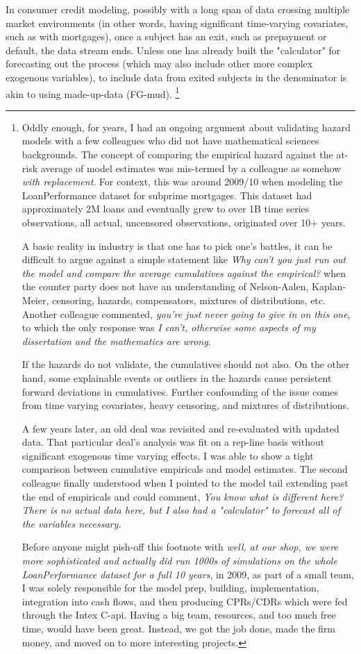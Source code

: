 \documentclass[10pt]{article}
\begin{document}
In consumer credit modeling, possibly with a long span of data crossing multiple market environments
(in other words, having significant time-varying covariates, such as with mortgages), 
once a subject has an exit, such as prepayment or default, the data stream ends.  
Unless one has already built the "calculator" for forecasting out the process (which may also include other 
more complex exogenous variables), to include
data from exited subjects in the denominator is akin to using made-up-data (FG-mud).
\footnote{Oddly enough, for years, I had an ongoing argument about validating hazard models with a few colleagues who did not have
mathematical sciences backgrounds.
The concept of comparing the empirical hazard against the at-risk average of model estimates was mis-termed by a colleague as somehow {\em with
replacement}.  For context, this was around 2009/10 when modeling the LoanPerformance dataset for subprime mortgages.  This dataset had
approximately 2M loans and eventually grew to over 1B time series observations, all actual, uncensored observations, originated over 10+
years.

A basic reality in industry is that one has to pick one's battles, 
it can be difficult to argue against a simple statement like
{\em Why can't you just run out the model and compare the average cumulatives
against the empirical?} when the counter party does not have an understanding of Nelson-Aalen, Kaplan-Meier, censoring, hazards, compensators, mixtures of
distributions, etc.  
Another colleague commented, {\em you're just never going to give in on this one}, to which the only response was {\em I can't, otherwise some aspects of my dissertation and 
the mathematics are wrong}.  

If the hazards do not validate, the cumulatives should not also.  On the other hand, 
some explainable events or outliers in the hazards cause persistent forward deviations in cumulatives.
Further confounding of the issue comes from time varying covariates, heavy censoring, and mixtures of distributions.

A few years later, an old deal was revisited and re-evaluated with updated data.  
That particular deal's analysis was fit on a rep-line basis without significant exogenous time varying effects.  
I was able to show a tight comparison between cumulative empiricals and model estimates.
The second colleague finally understood 
when I pointed to the model tail extending past the end of empiricals and could comment, {\em You know what is different here? There is no
actual data here, but I also had a "calculator" to forecast all of the variables necessary.}

Before anyone might pish-off this footnote with {\em well, at our shop, we were more sophisticated and actually did run 1000s of simulations on the
whole LoanPerformance dataset for a full 10 years}, in 2009, as part of a small team, I was solely responsible for the model prep, building, implementation, 
integration into cash flows, and then producing CPRs/CDRs which were fed through the Intex C-api.  Having a big team, resources, and too
much free time, would have been great. Instead, we got the job done, made the firm money, and moved on to more interesting projects.
}
\end{document}
